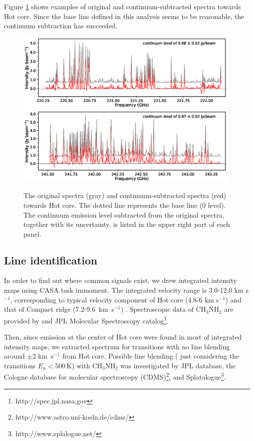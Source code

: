 Figure \ref{SVspec} shows examples of original and continuum-subtracted spectra towards Hot core. 
Since the base line defined in this analysis seems to be reasonable, the continuum subtraction has succeeded.

\begin{figure}[htbp]
  \centering
  \includegraphics[width=0.98\textwidth]{OrionKL/spec_spw2.eps}
  \includegraphics[width=0.98\textwidth]{OrionKL/spec_spw13.eps}
  \caption{The original spectra (gray) and continuum-subtracted spectra (red) towards Hot core. 
  The dotted line represents the base line (0 level). The continuum emission level subtracted from the original spectra, 
  together with its uncertainty, is listed in the upper right part of each panel.}
  \label{SVspec}
\end{figure}


\newpage
\subsection{Line identification}
In order to find out where common signals exist, we drew integrated intensity maps 
using CASA task {\sc immoment}. The integrated velocity range is 3.0-12.0 km s$^{-1}$, corresponding to
typical velocity component of Hot core (4.8-6 km s$^{-1}$) and that of Compact ridge 
(7.2-9.6~km~s$^{-1}$) \citep{Feng+2015}.
Spectroscopic data of CH$_3$NH$_2$ are provided by \citet{Motiyenko+2014} and 
JPL Molecular Spectroscopy catalog\footnote{http://spec.jpl.nasa.gov}.

Then, since emission at the center of Hot core were found in most of integrated intensity maps, 
we extracted spectrum for transitions with no line blending around $\pm$2 km~s$^{-1}$ from Hot core.
Possible line blending ( just considering the transitions $E_{\mathrm{u}} < 500\, \mathrm{K}$) with CH$_{3}$NH$_{2}$ was investigated by JPL database, 
the Cologne database for molecular spectroscopy (CDMS)\footnote{http://www.astro.uni-koeln.de/cdms/}, 
and Splatalogue\footnote{http://www.splalogue.net/}. 

